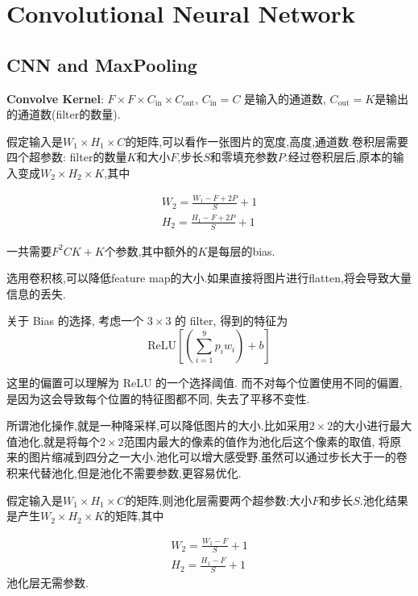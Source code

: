 \section{Convolutional Neural Network}

\subsection{CNN and MaxPooling}
\textbf{Convolve Kernel}: $F\times F \times C_{\text{in}} \times C_{\text{out}}$, $C_{\text{in}} = C$ 是输入的通道数, $C_{\text{out}} = K$是输出的通道数(filter的数量).

假定输入是$W_1 \times H_1 \times C$的矩阵,可以看作一张图片的宽度,高度,通道数.卷积层需要四个超参数:
filter的数量$K$和大小$F$,步长$S$和零填充参数$P$.经过卷积层后,原本的输入变成$W_2 \times H_2 \times K$,其中

\begin{equation}
	\begin{split}
		W_2 = \frac{W_1 - F + 2P}{S} + 1
		\\
		H_2 = \frac{H_1 - F + 2P}{S} + 1
	\end{split}
\end{equation}

一共需要$F^2CK+K$个参数,其中额外的$K$是每层的bias. 

选用卷积核,可以降低feature map的大小.如果直接将图片进行flatten,将会导致大量信息的丢失.

关于 Bias 的选择, 考虑一个 $3\times 3$ 的 filter, 得到的特征为
\[
	\text{ReLU} \left[\left(\sum_{i=1}^{9} p_i w_i\right) + b\right]
\]

这里的偏置可以理解为 ReLU 的一个选择阈值. 而不对每个位置使用不同的偏置, 是因为这会导致每个位置的特征图都不同, 失去了平移不变性. 

所谓池化操作,就是一种降采样,可以降低图片的大小.比如采用$2\times 2$的大小进行最大值池化,就是将每个$2\times 2$范围内最大的像素的值作为池化后这个像素的取值,
将原来的图片缩减到四分之一大小.池化可以增大感受野.虽然可以通过步长大于一的卷积来代替池化,但是池化不需要参数,更容易优化.

假定输入是$W_1 \times H_1 \times C$的矩阵,则池化层需要两个超参数:大小$F$和步长$S$.池化结果是产生$W_2 \times H_2 \times K$的矩阵,其中

\begin{equation}
	\begin{split}
		W_2 = \frac{W_1 - F}{S} + 1
		\\
		H_2 = \frac{H_1 - F}{S} + 1
	\end{split}
\end{equation}
池化层无需参数.

